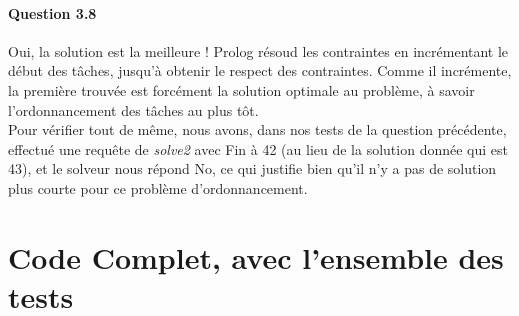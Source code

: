 \documentclass[11pt]{article} %
\begin{document}
\paragraph{Question 3.8}
Oui, la solution est la meilleure !
Prolog résoud les contraintes en incrémentant le début des tâches, jusqu'à obtenir le respect des contraintes.
Comme il incrémente, la première trouvée est forcément la solution optimale au problème, à savoir l'ordonnancement des tâches au plus tôt. \\ Pour vérifier tout de même, nous avons, dans nos tests de la question précédente, effectué une requête de \textit{solve2} avec Fin à 42 (au lieu de la solution donnée qui est 43), et le solveur nous répond No, ce qui justifie bien qu'il n'y a pas de solution plus courte pour ce problème d'ordonnancement.
\newpage

\section{Code Complet, avec l'ensemble des tests}

\end{document}
